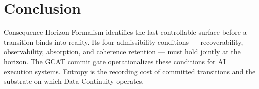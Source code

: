 \documentclass[letterpaper,10pt,conference]{ieeeconf}
\begin{document}
\section{Conclusion}

Consequence Horizon Formalism identifies the last controllable surface before a transition binds into reality. Its four admissibility conditions --- recoverability, observability, absorption, and coherence retention --- must hold jointly at the horizon. The GCAT commit gate operationalizes these conditions for AI execution systems. Entropy is the recording cost of committed transitions and the substrate on which Data Continuity operates.
\end{document}
